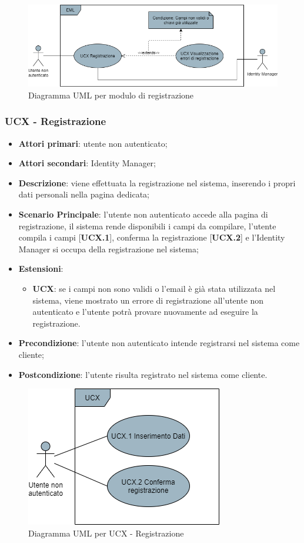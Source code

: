 \begin{figure}[H]
\centering
\includegraphics[scale=0.6]{res/UseCase/Immagini/RegistrazioneGenerale}
\caption{Diagramma UML per modulo di registrazione}
\end{figure}

\subsubsection{UCX - Registrazione}
\begin{itemize}
\item \textbf{Attori primari}: utente non autenticato;
\item \textbf{Attori secondari}: Identity Manager;
\item \textbf{Descrizione}: viene effettuata la registrazione nel sistema, inserendo i propri dati personali nella pagina dedicata;
\item \textbf{Scenario Principale}: l'utente non autenticato accede alla pagina di registrazione, il sistema rende disponibili i campi da compilare, l'utente compila i campi [\textbf{UCX.1}], conferma la registrazione [\textbf{UCX.2}] e l'Identity Manager si occupa della registrazione nel sistema;
\item \textbf{Estensioni}:
\begin{itemize}
\item \textbf{UCX}: se i campi non sono validi o l'email è già stata utilizzata nel sistema, viene mostrato un errore di registrazione all'utente non autenticato e l'utente potrà provare nuovamente ad eseguire la registrazione.
\end{itemize}
\item \textbf{Precondizione}: l'utente non autenticato intende registrarsi nel sistema come cliente;
\item \textbf{Postcondizione}: l'utente risulta registrato nel sistema come cliente.
\end{itemize}

\begin{figure}[H]
\centering
\includegraphics[scale=0.6]{res/UseCase/Immagini/Registrazione}
\caption{Diagramma UML per UCX - Registrazione}
\end{figure}

